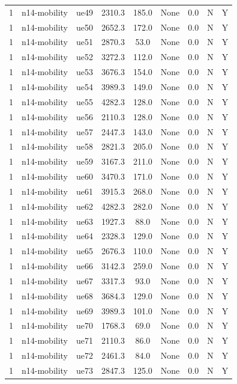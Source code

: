 \begin{table}[ht]
\begin{tabular}{|c|c|c|c|c|c|c|c|c|}
1 & n14-mobility & ue49 & 2310.3 & 185.0 & None & 0.0 & N & Y \\
1 & n14-mobility & ue50 & 2652.3 & 172.0 & None & 0.0 & N & Y \\
1 & n14-mobility & ue51 & 2870.3 & 53.0 & None & 0.0 & N & Y \\
1 & n14-mobility & ue52 & 3272.3 & 112.0 & None & 0.0 & N & Y \\
1 & n14-mobility & ue53 & 3676.3 & 154.0 & None & 0.0 & N & Y \\
1 & n14-mobility & ue54 & 3989.3 & 149.0 & None & 0.0 & N & Y \\
1 & n14-mobility & ue55 & 4282.3 & 128.0 & None & 0.0 & N & Y \\
1 & n14-mobility & ue56 & 2110.3 & 128.0 & None & 0.0 & N & Y \\
1 & n14-mobility & ue57 & 2447.3 & 143.0 & None & 0.0 & N & Y \\
1 & n14-mobility & ue58 & 2821.3 & 205.0 & None & 0.0 & N & Y \\
1 & n14-mobility & ue59 & 3167.3 & 211.0 & None & 0.0 & N & Y \\
1 & n14-mobility & ue60 & 3470.3 & 171.0 & None & 0.0 & N & Y \\
1 & n14-mobility & ue61 & 3915.3 & 268.0 & None & 0.0 & N & Y \\
1 & n14-mobility & ue62 & 4282.3 & 282.0 & None & 0.0 & N & Y \\
1 & n14-mobility & ue63 & 1927.3 & 88.0 & None & 0.0 & N & Y \\
1 & n14-mobility & ue64 & 2328.3 & 129.0 & None & 0.0 & N & Y \\
1 & n14-mobility & ue65 & 2676.3 & 110.0 & None & 0.0 & N & Y \\
1 & n14-mobility & ue66 & 3142.3 & 259.0 & None & 0.0 & N & Y \\
1 & n14-mobility & ue67 & 3317.3 & 93.0 & None & 0.0 & N & Y \\
1 & n14-mobility & ue68 & 3684.3 & 129.0 & None & 0.0 & N & Y \\
1 & n14-mobility & ue69 & 3989.3 & 101.0 & None & 0.0 & N & Y \\
1 & n14-mobility & ue70 & 1768.3 & 69.0 & None & 0.0 & N & Y \\
1 & n14-mobility & ue71 & 2110.3 & 86.0 & None & 0.0 & N & Y \\
1 & n14-mobility & ue72 & 2461.3 & 84.0 & None & 0.0 & N & Y \\
1 & n14-mobility & ue73 & 2847.3 & 125.0 & None & 0.0 & N & Y \\

\end{tabular}
\end{table}
